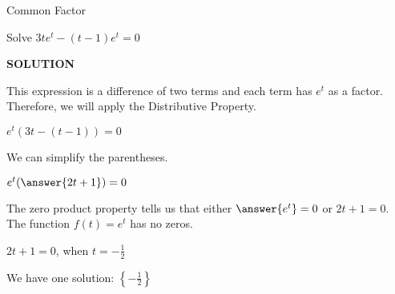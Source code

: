\documentclass{ximera}
\begin{document}
\begin{example} Common Factor


Solve $3t e^t - (t-1) e^t = 0$

\textbf{\textcolor{purple!50!blue!90!black}{SOLUTION}}



This expression is a difference of two terms and each term has $e^t$ as a factor.  Therefore, we will apply the Distributive Property.



$e^t (3t - (t-1))= 0$


We can simplify the parentheses.



$e^t (\answer{2t + 1})= 0$



The zero product property tells us that either $\answer{e^t} = 0$ or $2t + 1 = 0$.  \\

The function $f(t) = e^t$ has no zeros. 


$2t + 1 = 0$, when $t = -\frac{1}{2}$

We have one solution: $\left\{ -\frac{1}{2} \right\}$


\end{example}
\end{document}
